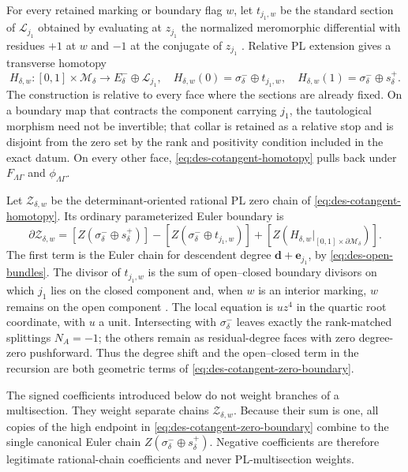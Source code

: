For every retained marking or boundary flag $w$, let
$t_{j_1,w}$ be the standard section of $\mathcal L_{j_1}$ obtained by
evaluating at $z_{j_1}$ the normalized meromorphic differential with residues
$+1$ at $w$ and $-1$ at the conjugate of $z_{j_1}$
\cite[Notation~6.1]{grossetal2022open}.  Relative PL extension gives a
transverse homotopy
\begin{equation}
 H_{\delta,w}:[0,1]\times\mathcal M_\delta
 \longrightarrow E_\delta^-\oplus\mathcal L_{j_1},
 \quad
 H_{\delta,w}(0)=\sigma_\delta^-\oplus t_{j_1,w},
 \quad
 H_{\delta,w}(1)=\sigma_\delta^-\oplus s_\delta^+.
 \label{eq:des-cotangent-homotopy}
\end{equation}
The construction is relative to every face where the sections are already
fixed.  On a boundary map that contracts the component carrying $j_1$, the
tautological morphism need not be invertible; that collar is retained as a
relative stop and is disjoint from the zero set by the rank and positivity
condition included in the exact datum.  On every other face,
\eqref{eq:des-cotangent-homotopy} pulls back under
$F_{\Lambda\Gamma}$ and $\phi_{\Lambda\Gamma}$.

Let $\mathcal Z_{\delta,w}$ be the determinant-oriented rational PL zero
chain of \eqref{eq:des-cotangent-homotopy}.  Its ordinary parameterized Euler
boundary is
\begin{equation}
 \partial\mathcal Z_{\delta,w}
 =[Z(\sigma_\delta^-\oplus s_\delta^+)]
 -[Z(\sigma_\delta^-\oplus t_{j_1,w})]
 +[Z(H_{\delta,w}|_{[0,1]\times\partial\mathcal M_\delta})].
 \label{eq:des-cotangent-zero-boundary}
\end{equation}
The first term is the Euler chain for descendent degree
$\mathbf d+\mathbf e_{j_1}$, by \eqref{eq:des-open-bundles}.  The divisor of
$t_{j_1,w}$ is the sum of open--closed boundary divisors on which $j_1$ lies
on the closed component and, when $w$ is an interior marking, $w$ remains on
the open component \cite[Lem.~6.4]{grossetal2022open}.  The local equation is
$u z^4$ in the quartic root coordinate, with $u$ a unit.  Intersecting with
$\sigma_\delta^-$ leaves exactly the rank-matched splittings $N_A=-1$; the
others remain as residual-degree faces with zero degree-zero pushforward.
Thus the degree shift and the open--closed term in the recursion are both
geometric terms of \eqref{eq:des-cotangent-zero-boundary}.

The signed coefficients introduced below do not weight branches of a
multisection.  They weight separate chains $\mathcal Z_{\delta,w}$.  Because
their sum is one, all copies of the high endpoint in
\eqref{eq:des-cotangent-zero-boundary} combine to the single canonical Euler
chain $Z(\sigma_\delta^-\oplus s_\delta^+)$.  Negative coefficients are
therefore legitimate rational-chain coefficients and never PL-multisection
weights.

